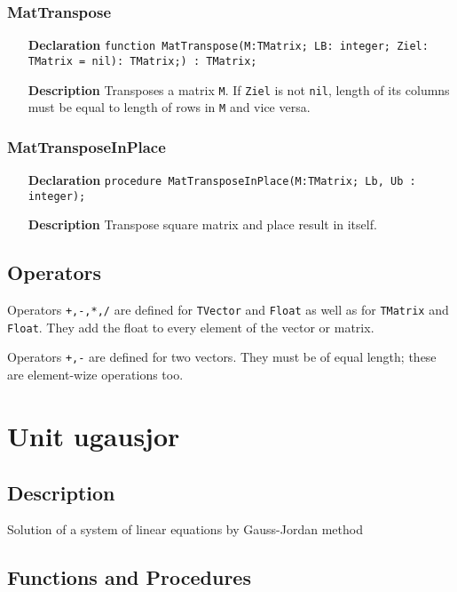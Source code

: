 \documentclass[12pt,a4paper,oneside]{report}
\newcommand{\declarationitem}[1]{\textbf{#1}}
\newcommand{\descriptiontitle}[1]{\textbf{#1}}
\newcommand{\code}[1]{\texttt{#1}}
\begin{document}
\subsubsection{MatTranspose}
\label{MatTranspose}
\begin{itemize}
\item[\declarationitem{Declaration}\hfill]\code{function MatTranspose(M:TMatrix; LB: integer; Ziel: TMatrix = nil): TMatrix;) : TMatrix;}
\item[\descriptiontitle{Description}] Transposes a matrix \code{M}. If \code{Ziel} is not \code{nil}, length of its columns must be equal to length of rows in \code{M} and vice versa.
\end{itemize}
\subsubsection{MatTransposeInPlace}
\label{MatTransposeInPlace}
\begin{itemize}
\item[\declarationitem{Declaration}\hfill]\code{procedure MatTransposeInPlace(M:TMatrix; Lb, Ub : integer);}
\item[\descriptiontitle{Description}]Transpose square matrix and place result in itself.
\end{itemize}
\subsection{Operators}
Operators \code{+,-,*,/} are defined for \code{TVector} and \code{Float} as well as for \code{TMatrix} and \code{Float}. They add the float to every element of the vector or matrix.

Operators \code{+,-} are defined for two vectors. They must be of equal length; these are element-wize operations too.
 
\section{Unit ugausjor}
\label{ugausjor}
\subsection{Description}
Solution of a system of linear equations by Gauss{-}Jordan method
\subsection{Functions and Procedures}
\end{document}
